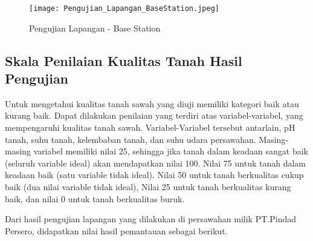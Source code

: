         \begin{figure}[H]
        	\centering  
        	\texttt{[image: Pengujian\_Lapangan\_BaseStation.jpeg]} 
        	\caption[Pengujian Lapangan - Base Station]{Pengujian Lapangan - Base Station} 
        	\label{fig:Pengujian Lapangan - Base Station} 
        \end{figure}
        
   \subsection{Skala Penilaian Kualitas Tanah Hasil Pengujian}
       Untuk mengetahui kualitas tanah sawah yang diuji memiliki kategori baik atau kurang baik. Dapat dilakukan penilaian yang terdiri atas variabel-variabel, yang mempengaruhi kualitas tanah sawah. Variabel-Variabel tersebut antarlain, pH tanah, suhu tanah, kelembaban tanah, dan suhu udara persawahan. Masing-masing variabel memiliki nilai 25, sehingga jika tanah dalam keadaan sangat baik (seluruh variable ideal) akan mendapatkan nilai 100. Nilai 75 untuk tanah dalam keadaan baik (satu variable tidak ideal). Nilai 50 untuk tanah berkualitas cukup baik (dua nilai variable tidak ideal), Nilai 25 untuk tanah berkualitas kurang baik, dan nilai 0 untuk tanah berkualitas buruk.
       
       Dari hasil pengujian lapangan yang dilakukan di persawahan milik PT.Pindad Persero, didapatkan nilai hasil pemantauan sebagai berikut.
       
